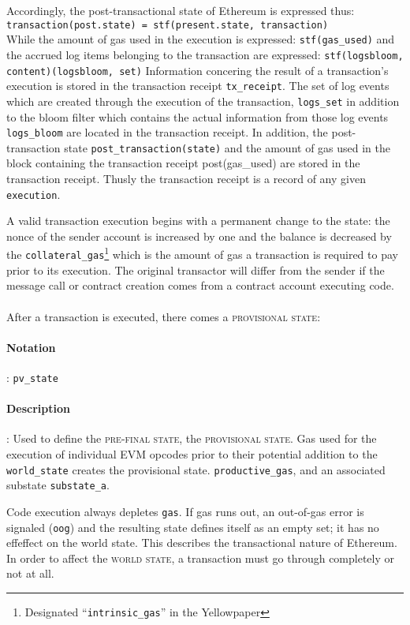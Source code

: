 \documentclass[10pt,a4paper,leqno,bibliography=totoc]{scrartcl}
\newenvironment{alphafootnotes}
{\par\edef\savedfootnotenumber{\number\value{footnote}}
\renewcommand{\thefootnote}{\alph{footnote}}
\setcounter{footnote}{0}}
{\par\setcounter{footnote}{\savedfootnotenumber}}
\begin{document}
\begin{alphafootnotes}
\begin{multicols*}{2}
				Accordingly, the post-transactional state of Ethereum is expressed thus: 
				\\
				\texttt{transaction(post.state) = stf(present.state, transaction)}  
				\\
				While the amount of gas used in the execution is expressed: \texttt{stf(gas\_used)} and the accrued log items belonging to the transaction are expressed: \texttt{stf(logsbloom, content)(logsbloom, set)} Information concering the result of a transaction's execution is stored in the transaction receipt \texttt{tx\_receipt}. The set of log events which are created through the execution of the transaction, \texttt{logs\_set} in addition to the bloom filter which contains the actual information from those log events \texttt{logs\_bloom} are located in the transaction receipt. In addition, the post-transaction state \texttt{post\_transaction(state)} and the amount of gas used in the block containing the transaction receipt post(gas\_used) are stored in the transaction receipt. Thusly the transaction receipt is a record of any given \texttt{execution}. \par

																			A valid transaction execution begins with a permanent change to the state: the nonce of the sender account is increased by one and the balance is decreased by the \texttt{collateral\_gas}\footnote{Designated ``\texttt{intrinsic\_gas}'' in the Yellowpaper} which is the amount of gas a transaction is required to pay prior to its execution. The original transactor will differ from the sender if the message call or contract creation comes from a contract account executing code. 
			
			\paragraph{}After a transaction is executed, there comes a \textsc{provisional state}:
			\paragraph{Notation}: \texttt{pv\_state}
			\paragraph{Description}: Used to define the \textsc{pre-final state}, the \textsc{provisional state.} 
			Gas used for the execution of individual EVM opcodes prior to their potential addition to the \texttt{world\_state} creates the provisional state. \texttt{productive\_gas}, and an associated substate \texttt{substate\_a}. 
\par
																			Code execution always depletes \texttt{gas}. If gas runs out, an out-of-gas error is signaled (\texttt{oog}) and the resulting state defines itself as an empty set; it has no effeffect on the world state. This describes the transactional nature of Ethereum. In order to affect the \textsc{world state}, a transaction must go through completely or not at all. 



\end{multicols*}
\end{alphafootnotes}
\end{document}
